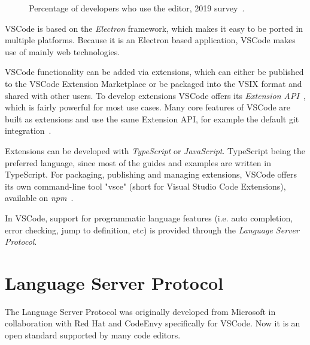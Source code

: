 \begin{figure}[ht]
    \caption{Percentage of developers who use the editor, 2019 survey~\parencite{editors_pop}.}
    \label{fig:editors_pop}
\end{figure}

VSCode is based on the \emph{Electron} framework, which makes it easy to be ported in multiple platforms. Because it is an Electron based application, VSCode makes use of mainly web technologies.

VSCode functionality can be added via extensions, which can either be published to the VSCode Extension Marketplace or be packaged into the VSIX format and shared with other users. To develop extensions VSCode offers its \emph{Extension API}~\parencite{extension_api}, which is fairly powerful for most use cases. Many core features of VSCode are built as extensions and use the same Extension API, for example the default git integration~\parencite{git_integration}.

Extensions can be developed with \emph{TypeScript} or \emph{JavaScript}. TypeScript being the preferred language, since most of the guides and examples are written in TypeScript. For packaging, publishing and managing extensions, VSCode offers its own command-line tool "vsce" (short for Visual Studio Code Extensions), available on \emph{npm}~\parencite{vsce_npm}.

In VSCode, support for programmatic language features (i.e. auto completion, error checking, jump to definition, etc) is provided through the \emph{Language Server Protocol}.

\section{Language Server Protocol}
The Language Server Protocol was originally developed from Microsoft in collaboration with Red Hat and CodeEnvy specifically for VSCode. Now it is an open standard supported by many code editors.

